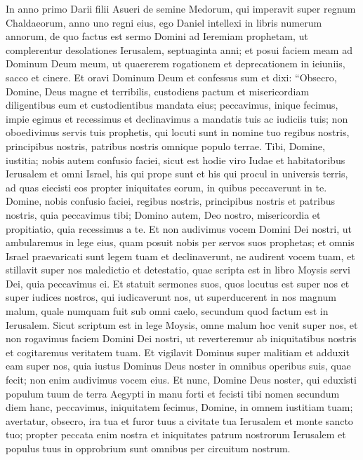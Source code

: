 \begin{biblechapter}  
\verse In anno primo Darii filii Asueri de semine Medorum, qui imperavit super regnum Chaldaeorum, 
\verse anno uno regni eius, ego Daniel intellexi in libris numerum annorum, de quo factus est sermo Domini ad Ieremiam prophetam, ut complerentur desolationes Ierusalem, septuaginta anni; 
\verse et posui faciem meam ad Dominum Deum meum, ut quaererem rogationem et deprecationem in ieiuniis, sacco et cinere. 
\verse Et oravi Dominum Deum et confessus sum et dixi: “Obsecro, Domine, Deus magne et terribilis, custodiens pactum et misericordiam diligentibus eum et custodientibus mandata eius; 
\verse peccavimus, inique fecimus, impie egimus et recessimus et declinavimus a mandatis tuis ac iudiciis tuis; 
\verse non oboedivimus servis tuis prophetis, qui locuti sunt in nomine tuo regibus nostris, principibus nostris, patribus nostris omnique populo terrae.  
\verse Tibi, Domine, iustitia; nobis autem confusio faciei, sicut est hodie viro Iudae et habitatoribus Ierusalem et omni Israel, his qui prope sunt et his qui procul in universis terris, ad quas eiecisti eos propter iniquitates eorum, in quibus peccaverunt in te. 
\verse Domine, nobis confusio faciei, regibus nostris, principibus nostris et patribus nostris, quia peccavimus tibi; 
\verse Domino autem, Deo nostro, misericordia et propitiatio, quia recessimus a te. 
\verse Et non audivimus vocem Domini Dei nostri, ut ambularemus in lege eius, quam posuit nobis per servos suos prophetas; 
\verse et omnis Israel praevaricati sunt legem tuam et declinaverunt, ne audirent vocem tuam, et stillavit super nos maledictio et detestatio, quae scripta est in libro Moysis servi Dei, quia peccavimus ei.  
\verse Et statuit sermones suos, quos locutus est super nos et super iudices nostros, qui iudicaverunt nos, ut superducerent in nos magnum malum, quale numquam fuit sub omni caelo, secundum quod factum est in Ierusalem. 
\verse Sicut scriptum est in lege Moysis, omne malum hoc venit super nos, et non rogavimus faciem Domini Dei nostri, ut reverteremur ab iniquitatibus nostris et cogitaremus veritatem tuam. 
\verse Et vigilavit Dominus super malitiam et adduxit eam super nos, quia iustus Dominus Deus noster in omnibus operibus suis, quae fecit; non enim audivimus vocem eius. 
\verse Et nunc, Domine Deus noster, qui eduxisti populum tuum de terra Aegypti in manu forti et fecisti tibi nomen secundum diem hanc, peccavimus, iniquitatem fecimus, 
\verse Domine, in omnem iustitiam tuam; avertatur, obsecro, ira tua et furor tuus a civitate tua Ierusalem et monte sancto tuo; propter peccata enim nostra et iniquitates patrum nostrorum Ierusalem et populus tuus in opprobrium sunt omnibus per circuitum nostrum.  

\end{biblechapter}
